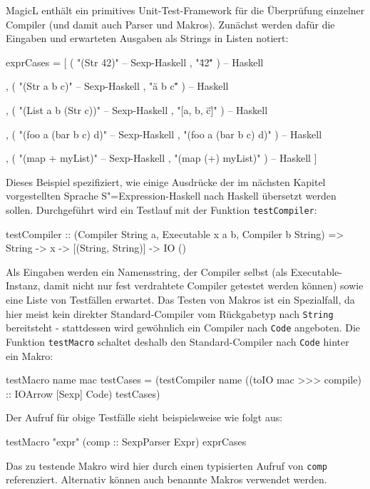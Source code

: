 \documentclass[11pt, a4paper, bibgerm]{scrbook}
\newcommand\icode[1]{\lstinline?#1?}
\newcommand{\sexp}{S"=Expression}
\begin{document}
MagicL enthält ein primitives Unit-Test-Framework für die Überprüfung
einzelner Compiler (und damit auch Parser und Makros). Zunächst werden
dafür die Eingaben und erwarteten Ausgaben als Strings in Listen
notiert:
\begin{code}
exprCases = [ ( "(Str 42)"                    -- Sexp-Haskell 
                , "\"42\"" )                  -- Haskell 

              , ( "(Str a  b c)"              -- Sexp-Haskell 
                , "\"a b c\"" )               -- Haskell 

              , ( "(List a b (Str c))"        -- Sexp-Haskell 
                , "[a, b, \"c\"]" )           -- Haskell 

              , ( "(foo a (bar b c) d)"       -- Sexp-Haskell 
                , "(foo a (bar b c) d)" )     -- Haskell 

              , ( "(map + myList)"            -- Sexp-Haskell 
                , "(map (+) myList)" )        -- Haskell 
              ]  
\end{code}
Dieses Beispiel spezifiziert, wie einige Ausdrücke der im nächsten
Kapitel vorgestellten Sprache \sexp{}-Haskell nach Haskell übersetzt
werden sollen. Durchgeführt wird ein Testlauf mit der Funktion
\icode{testCompiler}:
\begin{code} 
testCompiler :: 
  (Compiler String a, Executable x a b, Compiler b String) => 
  String -> x -> [(String, String)] -> IO ()
\end{code}
Als Eingaben werden ein Namensstring, der Compiler selbst (als
Executable-Instanz, damit nicht nur fest verdrahtete Compiler getestet
werden können) sowie eine Liste von Testfällen erwartet. Das Testen
von Makros ist ein Spezialfall, da hier meist kein direkter
Standard-Compiler vom Rückgabetyp nach \icode{String} bereitsteht -
stattdessen wird gewöhnlich ein Compiler nach \icode{Code}
angeboten. Die Funktion \icode{testMacro} schaltet deshalb den
Standard-Compiler nach \icode{Code} hinter ein
Makro:
\begin{code}
testMacro name mac testCases = 
  (testCompiler name 
                ((toIO mac >>> compile) :: IOArrow [Sexp] Code)
                testCases)
\end{code}
Der Aufruf für obige Testfälle sieht beispielsweise wie folgt aus:
\begin{code}
testMacro "expr" (comp :: SexpParser Expr) exprCases  
\end{code}
Das zu testende Makro wird hier durch einen typisierten Aufruf von
\icode{comp} referenziert. Alternativ können auch benannte Makros
verwendet werden.
\end{document}
